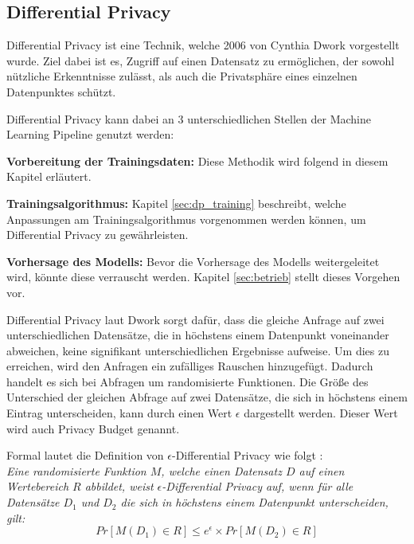 \subsection{Differential Privacy}\label{sec:dp}

Differential Privacy ist eine Technik, welche 2006 von Cynthia Dwork \cite{P-26} vorgestellt wurde.
Ziel dabei ist es, Zugriff auf einen Datensatz zu ermöglichen, der sowohl nützliche Erkenntnisse zulässt, als auch die Privatsphäre eines einzelnen Datenpunktes schützt.

Differential Privacy kann dabei an 3 unterschiedlichen Stellen der Machine Learning Pipeline genutzt werden:
\begin{compactitem}
\item \textbf{Vorbereitung der Trainingsdaten:} Diese Methodik wird folgend in diesem Kapitel erläutert.
\item \textbf{Trainingsalgorithmus:} Kapitel \ref{sec:dp_training} beschreibt, welche Anpassungen am Trainingsalgorithmus vorgenommen werden können, um Differential Privacy zu gewährleisten.
\item \textbf{Vorhersage des Modells:} Bevor die Vorhersage des Modells weitergeleitet wird, könnte diese verrauscht werden. Kapitel \ref{sec:betrieb} stellt dieses Vorgehen vor.
\end{compactitem}


Differential Privacy laut Dwork \cite{P-26} sorgt dafür, dass die gleiche Anfrage auf zwei unterschiedlichen Datensätze, die in höchstens einem Datenpunkt voneinander abweichen, keine signifikant unterschiedlichen Ergebnisse aufweise. 
Um dies zu erreichen, wird den Anfragen ein zufälliges Rauschen hinzugefügt. 
Dadurch handelt es sich bei Abfragen um randomisierte Funktionen.
Die Größe des Unterschied der gleichen Abfrage auf zwei Datensätze, die sich in höchstens einem Eintrag unterscheiden, kann durch einen Wert $\epsilon$ dargestellt werden. 
Dieser Wert wird auch Privacy Budget genannt.

Formal lautet die Definition von $\epsilon$-Differential Privacy wie folgt \cite{P-26}:\\
\textit{
Eine randomisierte Funktion $M$, welche einen Datensatz $D$ auf einen Wertebereich $R$ abbildet, weist $\epsilon$-Differential Privacy auf, wenn für alle Datensätze $D_{1}$ und $D_{2}$ die sich in höchstens einem Datenpunkt unterscheiden, gilt:}
\begin{equation}
    Pr[M(D_{1}) \in R] \leq e^{\epsilon} \times Pr[M(D_{2}) \in R]
\end{equation}

